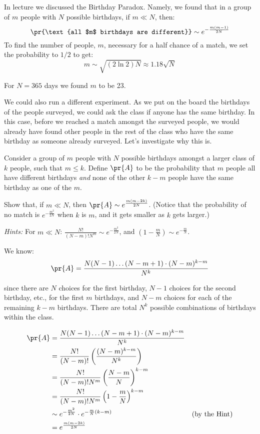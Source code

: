 \documentclass[handout]{mcs}
\begin{document}
\begin{problem}
In lecture we discussed the Birthday Paradox. Namely, we found that in
a group of $m$ people with $N$ possible birthdays, if $m \ll N$, then:
\[
\pr{\text{all $m$ birthdays are different}} \sim e^{-\frac{m(m-1)}{2N}}
\]
To find the number of people, $m$, necessary for a half chance of a
match, we set the probability to $1/2$ to get:
\[
m \sim \sqrt{(2\ln2)N} \approx 1.18\sqrt{N}
\]

For $N = 365$ days we found $m$ to be 23.

We could also run a different experiment. As we put on the board the
birthdays of the people surveyed, we could ask the class if anyone has
the same birthday. In this case, before we reached a match amongst the
surveyed people, we would already have found other people in the rest
of the class who have the same birthday as someone already
surveyed. Let's investigate why this is.

\bparts

\ppart Consider a group of $m$ people with $N$ possible birthdays
amongst a larger class of $k$ people, such that $m \leq k$. Define
$\pr{A}$ to be the probability that $m$ people all have different
birthdays \textit{and} none of the other $k-m$ people have the same
birthday as one of the $m$.

Show that, if $m \ll N$, then $\pr{A} \sim
e^{\frac{m(m-2k)}{2N}}$. (Notice that the probability of no match is
$e^{-\frac{m^2}{2N}}$ when $k$ is $m$, and it gets smaller as $k$ gets
larger.)

\hspace{0.5in} \textit{Hints:} For $m \ll N$: $\frac{N!}{(N-m)!N^m}
\sim e^{-\frac{m^2}{2N}}$, and $(1-\frac{m}{N}) \sim
e^{-\frac{m}{N}}$.

\begin{solution}

We know:
\[
\pr{A} = \frac{N(N-1)\ldots(N-m+1)\cdot(N-m)^{k-m}}{N^k}
\]

since there are $N$ choices for the first birthday, $N-1$ choices for
the second birthday, etc., for the first $m$ birthdays, and $N-m$
choices for each of the remaining $k-m$ birthdays. There are total
$N^k$ possible combinations of birthdays within the class.

\begin{align*}
\pr{A} &= \frac{N(N-1)\ldots(N-m+1)\cdot(N-m)^{k-m}}{N^k} \\
&= \frac{N!}{(N-m)!}\left(\frac{(N-m)^{k-m}}{N^k}\right) \\
&= \frac{N!}{(N-m)!N^m}\left(\frac{N-m}{N}\right)^{k-m} \\
&= \frac{N!}{(N-m)!N^m}\left(1-\frac{m}{N}\right)^{k-m} \\
&\sim e^{-\frac{m^2}{2N}} \cdot e^{-\frac{m}{N}(k-m)} & \text{(by the Hint)} \\
& = e^{\frac{m(m-2k)}{2N}}
\end{align*}
\end{solution}


\end{problem}
\end{document}
